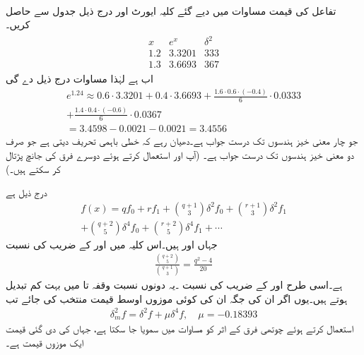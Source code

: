 \quad {}\\
تفاعل  کی قیمت مساوات  میں دیے گئے کلیہ ایورٹ اور درج ذیل جدول سے حاصل کریں۔
\begin{align*}
\begin{array}{c|cc}
x&e^x&\delta^2\\
\hline
1.2&3.3201&333\\
1.3&3.6693&367
\end{array}
\end{align*}
اب  ہے  لہٰذا مساوات  درج ذیل دے گی
\begin{multline*}
e^{1.24}\approx 0.6\cdot 3.3201+0.4\cdot 3.6693+\frac{1.6\cdot 0.6\cdot(-0.4)}{6}\cdot 0.0333\\
+\frac{1.4\cdot 0.4\cdot(-0.6)}{6}\cdot 0.0367\\
=3.4598-0.0021-0.0021=3.4556
\end{multline*}
جو چار معنی خیز ہندسوں تک درست جواب ہے۔دھیان رہے کہ خطی باہمی تحریف  دیتی ہے جو صرف دو معنی خیز ہندسوں تک درست جواب ہے۔ (آپ  اور  استعمال کرتے ہوئے دوسرے فرق کی جانچ پڑتال کر سکتے ہیں۔)

 درج ذیل ہے
\begin{multline}
f(x)=qf_0+rf_1+\binom{q+1}{3}\delta^2 f_0+\binom{r+1}{3}\delta^2 f_1\\
+\binom{q+2}{5}\delta^4 f_0+\binom{r+2}{5}\delta^4 f_1+\cdots
\end{multline}
جہاں  اور  ہیں۔اس کلیہ میں  اور  کے  ضریب  کی نسبت
\begin{align*}
\frac{\binom{q+2}{5}}{\binom{q+1}{3}}=\frac{q^2-4}{20}
\end{align*}
ہے۔اسی طرح  اور  کے  ضریب  کی نسبت ۔یہ دونوں نسبت وقفہ  تا  میں بہت کم تبدیل ہوتے ہیں۔یوں اگر ان کی جگہ ان کی کوئی موزوں اوسط قیمت  منتخب کی جائے  تب 
\begin{align}
\delta_m^2f=\delta^2f+\mu\delta^4f,\quad \mu=-0.18393
\end{align}
 استعمال کرتے ہوئے  چوتھی فرق کے اثر کو مساوات  میں سمویا جا سکتا ہے، جہاں  کی دی گئی قیمت ایک موزوں قیمت ہے۔

